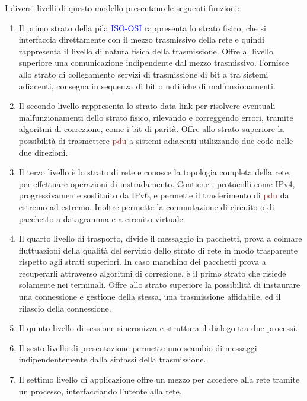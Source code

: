 \documentclass{article}
\numberwithin{equation}{subsection}
\begin{document}
I diversi livelli di questo modello presentano le seguenti funzioni:
\begin{enumerate}
    \item  Il primo strato della pila \textcolor{blue}{ISO-OSI} rappresenta lo strato fisico, che si interfaccia direttamente con il mezzo trasmissivo della rete e quindi rappresenta il livello di 
    natura fisica della trasmissione. Offre al livello superiore una comunicazione indipendente dal mezzo trasmissivo. Fornisce allo strato di collegamento servizi di 
    trasmissione di bit a tra sistemi adiacenti, consegna in sequenza di bit o notifiche di malfunzionamenti. 
    \item Il secondo livello rappresenta lo strato data-link per risolvere eventuali malfunzionamenti dello strato fisico, rilevando e correggendo errori, tramite algoritmi di correzione, come i bit di parità. 
    Offre allo strato superiore la possibilità di trasmettere \textcolor{Brown}{pdu} a sistemi adiacenti utilizzando due code nelle due direzioni. 
    \item Il terzo livello è lo strato di rete e conosce la topologia completa della rete, per effettuare operazioni di instradamento. Contiene i protocolli come \textcolor{BurntOrange}{IPv4}, 
    progressivamente sostituito da \textcolor{OliveGreen}{IPv6}, e permette il trasferimento di \textcolor{Brown}{pdu} da estremo ad estremo. Inoltre permette la commutazione di circuito o di pacchetto a datagramma e 
    a circuito virtuale. 
    \item Il quarto livello di trasporto, divide il messaggio in pacchetti, prova a colmare fluttuazioni della qualità del servizio dello strato di rete in modo 
    trasparente rispetto agli strati superiori. In caso manchino dei pacchetti prova a recuperarli attraverso algoritmi di correzione, è il primo strato che risiede 
    solamente nei terminali. Offre allo strato superiore la possibilità di instaurare una connessione e gestione della stessa, una trasmissione affidabile, ed il rilascio 
    della connessione. 
    \item Il quinto livello di sessione sincronizza e struttura il dialogo tra due processi.
    \item Il sesto livello di presentazione permette uno scambio di messaggi indipendentemente dalla sintassi della trasmissione. 
    \item Il settimo livello di applicazione offre un mezzo per accedere alla rete tramite un processo, interfacciando l'utente alla rete.  
\end{enumerate}
\end{document}
